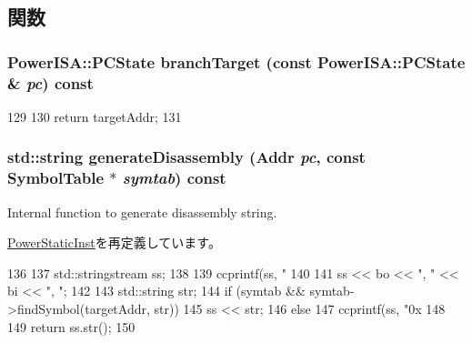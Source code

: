 \subsection{関数}
\hypertarget{classPowerISA_1_1BranchNonPCRelCond_a860401b0a6432ac5dbe246c64448d56d}{
\subsubsection[{branchTarget}]{\setlength{\rightskip}{0pt plus 5cm}PowerISA::PCState branchTarget (const PowerISA::PCState \& {\em pc}) const}}
\label{classPowerISA_1_1BranchNonPCRelCond_a860401b0a6432ac5dbe246c64448d56d}



\begin{DoxyCode}
129 {
130     return targetAddr;
131 }
\end{DoxyCode}
\hypertarget{classPowerISA_1_1BranchNonPCRelCond_a95d323a22a5f07e14d6b4c9385a91896}{
\subsubsection[{generateDisassembly}]{\setlength{\rightskip}{0pt plus 5cm}std::string generateDisassembly ({\bf Addr} {\em pc}, \/  const SymbolTable $\ast$ {\em symtab}) const}}
\label{classPowerISA_1_1BranchNonPCRelCond_a95d323a22a5f07e14d6b4c9385a91896}
Internal function to generate disassembly string. 

\hyperlink{classPowerISA_1_1PowerStaticInst_a95d323a22a5f07e14d6b4c9385a91896}{PowerStaticInst}を再定義しています。


\begin{DoxyCode}
136 {
137     std::stringstream ss;
138 
139     ccprintf(ss, "%
140 
141     ss << bo << ", " << bi << ", ";
142 
143     std::string str;
144     if (symtab && symtab->findSymbol(targetAddr, str))
145         ss << str;
146     else
147         ccprintf(ss, "0x%
148 
149     return ss.str();
150 }
\end{DoxyCode}



